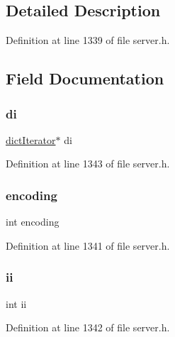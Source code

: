 \subsection{Detailed Description}


Definition at line 1339 of file server.\+h.



\subsection{Field Documentation}
\mbox{\label{structset_type_iterator_a30e26ff2250d4d8b49241087d755342a}} 
\subsubsection{\texorpdfstring{di}{di}}
{\footnotesize\ttfamily \hyperlink{structdict_iterator}{dict\+Iterator}$\ast$ di}



Definition at line 1343 of file server.\+h.

\mbox{\label{structset_type_iterator_ad1b45f33065aae3c757f56a692b25741}} 
\subsubsection{\texorpdfstring{encoding}{encoding}}
{\footnotesize\ttfamily int encoding}



Definition at line 1341 of file server.\+h.

\mbox{\label{structset_type_iterator_aa5b6e783cf10163187df5705f0d82d47}} 
\subsubsection{\texorpdfstring{ii}{ii}}
{\footnotesize\ttfamily int ii}



Definition at line 1342 of file server.\+h.


